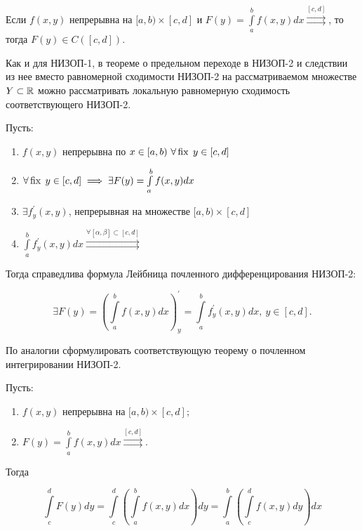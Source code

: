 \documentclass[../../main.tex]{subfiles}
\begin{document}
	\begin{crl*}
		Если $f(x, y)$ непрерывна на $[a, b) \times [c, d]$ и $F(y) = 
		\int\limits_a^b f(x, y) dx \overset{[c, d]}\rightrightarrows$, то тогда 
		$F(y) \in C([c, d])$.
	\end{crl*}

	\begin{rem}
		Как и для НИЗОП-1, в теореме о предельном переходе в НИЗОП-2 и следствии из 
		нее вместо равномерной сходимости НИЗОП-2 на рассматриваемом множестве $Y 
		\subset \mathbb{R}$ можно рассматривать локальную равномерную сходимость 
		соответствующего НИЗОП-2.
	\end{rem}

	\begin{thm}
		Пусть:

		\begin{enumerate}
			\item $f(x, y)$ непрерывна по $x \in [a, b)\ 
			\forall \fix \; y \in [c, d]$
			\item $\forall \operatorname{fix} \; y \in [c, d] \implies \exists F(y) = 
			\int\limits_{a}^{b} f(x, y) dx$ 
			\item $\exists f^{'}_{y} (x, y)$, непрерывная на множестве
			 $[a, b) \times [c, d]$
			\item $\int\limits_a^b f^{'}_y (x, y) dx \overset{\forall 
			[\alpha, \beta] \subset [c, d]}{\rightrightarrows}$
		\end{enumerate}

		Тогда справедлива формула Лейбница 
		почленного дифференцирования НИЗОП-2:
		
		\[ \exists F(y) = \left( \int\limits_a^b f(x, y) dx \right)^{'}_y = 
		\int\limits_a^b f^{'}_y (x, y) dx, \ y \in [c, d]. \]
	\end{thm}

	\begin{exc}
		По аналогии сформулировать соответствующую теорему о почленном 
		интегрировании НИЗОП-2.
	\end{exc}

	\begin{eans}
	\begin{thm}
		Пусть:
		\begin{enumerate}
			\item $f(x, y)$ непрерывна на $[a, b) \times [c, d];$
			\item $F(y) = \int\limits_a^b f(x, y) dx \overset{[c, 
			d]}{\rightrightarrows}.$
		\end{enumerate}
	
		Тогда
		
		\[
			\int\limits_c^d F(y) dy = \int\limits_c^d \left( \int\limits_a^b f(x, y) dx 
			\right) dy = \int\limits_a^b \left( \int\limits_c^d f(x, y) dy \right) dx
		\]
	\end{thm}
	\end{eans}
\end{document}

